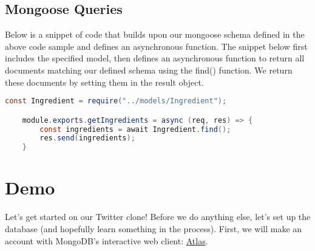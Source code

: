 \subsection*{Mongoose Queries}

Below is a snippet of code that builds upon our mongoose schema defined in the above code sample and defines an asynchronous function. The snippet below first includes the specified model, then defines an asynchronous function to return all documents matching our defined schema using the find() function. We return these documents by setting them in the result object.

\begin{lstlisting}[language=Java]
    const Ingredient = require("../models/Ingredient");

    module.exports.getIngredients = async (req, res) => {
        const ingredients = await Ingredient.find();
        res.send(ingredients);
    }
\end{lstlisting}
    
\section{Demo}
Let's get started on our Twitter clone! Before we do anything else, let's set up the database (and hopefully learn something in the process). First, we will make an account with MongoDB's interactive web client: \href{https://cloud.mongodb.com/}{Atlas}.

